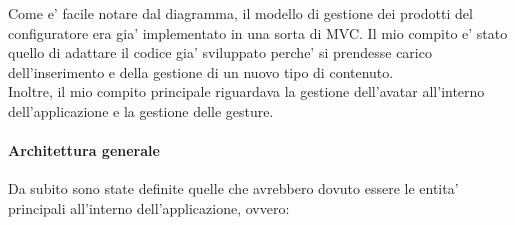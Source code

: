 Come e' facile notare dal diagramma, il modello di gestione dei prodotti del configuratore era gia' implementato in una sorta di MVC. Il mio compito e' stato quello di adattare il codice gia' sviluppato perche' si prendesse carico dell'inserimento e della gestione di un nuovo tipo di contenuto. \\
Inoltre, il mio compito principale riguardava la gestione dell'avatar all'interno dell'applicazione e la gestione delle gesture.

\paragraph{Architettura generale}
Da subito sono state definite quelle che avrebbero dovuto essere le entita' principali all'interno dell'applicazione, ovvero:

